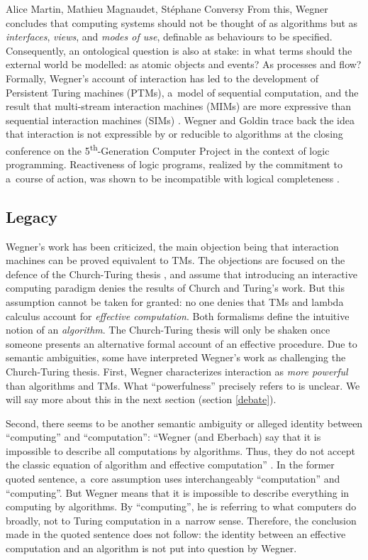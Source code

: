 \begin{artengenv2auth}{Alice Martin, Mathieu Magnaudet, Stéphane Conversy}
From this, Wegner concludes that computing systems should not be thought of as algorithms but as \textit{interfaces}, \textit{views}, and \textit{modes of use}, definable as behaviours to be specified. Consequently, an ontological question is also at stake: in what terms should the external world be modelled: as atomic objects and events? As processes and flow?
Formally, Wegner’s account of interaction has led to the development of Persistent Turing machines (PTMs), a~model of sequential computation, and the result that multi-stream interaction machines (MIMs) are more expressive than sequential interaction machines (SIMs) \parencite{Goldin2000, Goldin2004}. Wegner and Goldin trace back the idea that interaction is not expressible by or reducible to algorithms at the closing conference on the 5\textsuperscript{th}-Generation Computer Project in the context of logic programming. Reactiveness of logic programs, realized by the commitment to a~course of action, was shown to be incompatible with logical completeness \parencite{Wegner1999}.

\subsection{Legacy}

Wegner's work has been criticized, the main objection being that interaction machines can be proved equivalent to TMs. The objections are focused on the defence of the Church-Turing thesis \parencite{Cockshott2007, Prasse1998}, and assume that introducing an interactive computing paradigm denies the results of Church and Turing's work. But this assumption cannot be taken for granted: no one denies that TMs and lambda calculus account for \textit{effective computation}. Both formalisms define the intuitive notion of an \textit{algorithm}. The Church-Turing thesis will only be shaken once someone presents an alternative formal account of an effective procedure. Due to semantic ambiguities, some have interpreted Wegner's work as challenging the Church-Turing thesis. First, Wegner characterizes interaction as \textit{more powerful} than algorithms and TMs. What ``powerfulness'' precisely refers to is unclear. We will say more about this in the next section (section \ref{debate}).

Second, there seems to be another semantic ambiguity or alleged identity between ``computing'' and ``computation'': ``Wegner (and Eberbach) say that it is impossible to describe all computations by algorithms. Thus, they do not accept the classic equation of algorithm and effective computation'' \parencite{Cockshott2007}. In the former quoted sentence, a~core assumption uses interchangeably ``computation'' and ``computing''. But Wegner means that it is impossible to describe everything in computing by algorithms. By ``computing'', he is referring to what computers do broadly, not to Turing computation in a~narrow sense. Therefore, the conclusion made in the quoted sentence does not follow: the identity between an effective computation and an algorithm is not put into question by Wegner. 



\end{artengenv2auth}
